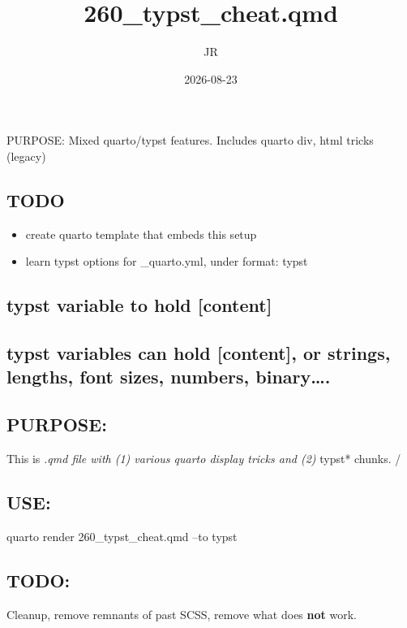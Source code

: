 \documentclass[
]{report}
\title{260\_typst\_cheat.qmd}
\author{JR}
\date{2026-08-23}
\providecommand{\tightlist}{%
  \setlength{\itemsep}{0pt}\setlength{\parskip}{0pt}}
\begin{document}
\maketitle


PURPOSE: Mixed quarto/typst features. Includes quarto div, html tricks
(legacy)

\subsection{TODO}\label{todo}

\begin{itemize}
\tightlist
\item
  create quarto template that embeds this setup
\item
  learn typst options for \_quarto.yml, under format: typst
\end{itemize}

\subsection{typst variable to hold
{[}content{]}}\label{typst-variable-to-hold-content}

\subsection{typst variables can hold {[}content{]}, or strings, lengths,
font sizes, numbers,
binary\ldots.}\label{typst-variables-can-hold-content-or-strings-lengths-font-sizes-numbers-binary.}

\subsection{PURPOSE:}\label{purpose}

This is \emph{.qmd file with (1) various quarto display tricks and (2)
}typst* chunks. /

\subsection{USE:}\label{use}

quarto render 260\_typst\_cheat.qmd --to typst

\subsection{TODO:}\label{todo-1}

Cleanup, remove remnants of past SCSS, remove what does \textbf{not}
work.
\end{document}

